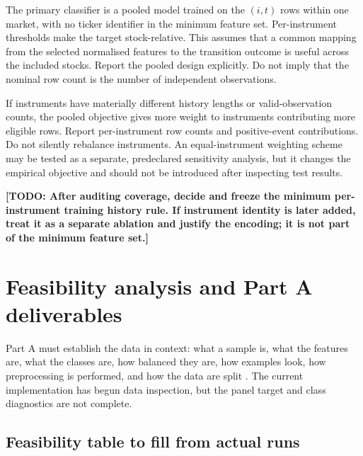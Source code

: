 \documentclass[11pt,a4paper]{article}
\newcommand{\todo}[1]{\textcolor{red!75!black}{\textbf{[TODO: #1]}}}
\begin{document}
The primary classifier is a pooled model trained on the $(i,t)$ rows within one market, with no ticker identifier in the minimum feature set. Per-instrument thresholds make the target stock-relative. This assumes that a common mapping from the selected normalised features to the transition outcome is useful across the included stocks. Report the pooled design explicitly. Do not imply that the nominal row count is the number of independent observations.

If instruments have materially different history lengths or valid-observation counts, the pooled objective gives more weight to instruments contributing more eligible rows. Report per-instrument row counts and positive-event contributions. Do not silently rebalance instruments. An equal-instrument weighting scheme may be tested as a separate, predeclared sensitivity analysis, but it changes the empirical objective and should not be introduced after inspecting test results.

\todo{After auditing coverage, decide and freeze the minimum per-instrument training history rule. If instrument identity is later added, treat it as a separate ablation and justify the encoding; it is not part of the minimum feature set.}

\section{Feasibility analysis and Part A deliverables}
\label{sec:feasibility}

Part A must establish the data in context: what a sample is, what the features are, what the classes are, how balanced they are, how examples look, how preprocessing is performed, and how the data are split \cite{UiOProject3}. The current implementation has begun data inspection, but the panel target and class diagnostics are not complete.

\subsection{Feasibility table to fill from actual runs}
\end{document}
